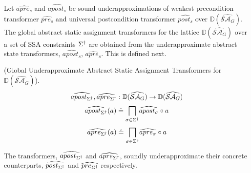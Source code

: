 %
Let $\widehat{apre_s}$ and $\widehat{apost_s}$ be sound underapproximations of
weakest precondition transformer $\widehat{pre_s}$ and universal postcondition 
transformer $\widehat{post_s}$ over $\mathbb{D}(\widehat{\mathcal{SA}_{G}})$. 
%
The global abstract static assignment transformers for the 
lattice $\mathbb{D}(\widehat{\mathcal{SA}_G})$ over a set of 
SSA constraints $\Sigma^\dagger$ are obtained from the underapproximate 
abstract state transformers, $\widehat{apost_s}$, $\widehat{apre_s}$. 
This is defined next.
%
\begin{definition} (Global Underapproximate Abstract Static Assignment
  Transformers for $\mathbb{D}(\widehat{\mathcal{SA}_G})$). 
  \[ 
     \widehat{apost_{\Sigma^\dagger}}, \widehat{apre_{\Sigma^\dagger}} : 
     \mathbb{D}(\widehat{\mathcal{SA}_G}) \rightarrow
     \mathbb{D}(\widehat{\mathcal{SA}_{G}}) 
   \]
   \[
     \widehat{apost_{\Sigma^\dagger}}(a) \mathrel{\hat=} 
     \underset{\sigma \in \Sigma^\dagger}{\bigsqcap} \widehat{apost_{\sigma}} \circ a 
   \]
  \[
    \widehat{apre_{\Sigma^\dagger}}(a) \mathrel{\hat=} 
    \underset{\sigma \in \Sigma^\dagger}{\bigsqcap} \widehat{apre_{\sigma}} \circ a 
   \]
\end{definition}
%
The transformers, $\widehat{apost_{\Sigma^\dagger}}$ and
$\widehat{apre_{\Sigma^\dagger}}$, soundly underapproximate 
their concrete counterparts, $\widehat{post_{\Sigma^\dagger}}$ 
and $\widehat{pre_{\Sigma^\dagger}}$ respectively. 
%


